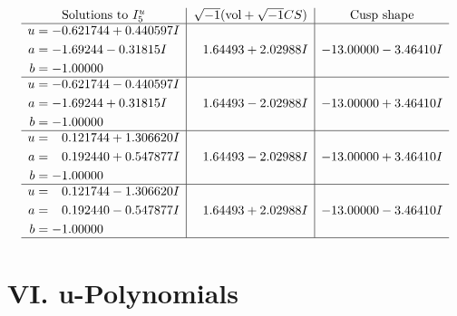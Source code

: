 \documentclass[1p]{elsarticle_modified}
\theoremstyle{definition}
\newcommand{\I}{\sqrt{-1}}
\begin{document}
$$\begin{array}{c|c|c}  
\text{Solutions to }I^u_{5}& \I (\text{vol} + \sqrt{-1}CS) & \text{Cusp shape}\\
 \hline 
\begin{aligned}
u &= -0.621744 + 0.440597 I \\
a &= -1.69244 - 0.31815 I \\
b &= -1.00000\phantom{ +0.000000I}\end{aligned}
 & \phantom{-}1.64493 + 2.02988 I & -13.00000 - 3.46410 I \\ \hline\begin{aligned}
u &= -0.621744 - 0.440597 I \\
a &= -1.69244 + 0.31815 I \\
b &= -1.00000\phantom{ +0.000000I}\end{aligned}
 & \phantom{-}1.64493 - 2.02988 I & -13.00000 + 3.46410 I \\ \hline\begin{aligned}
u &= \phantom{-}0.121744 + 1.306620 I \\
a &= \phantom{-}0.192440 + 0.547877 I \\
b &= -1.00000\phantom{ +0.000000I}\end{aligned}
 & \phantom{-}1.64493 - 2.02988 I & -13.00000 + 3.46410 I \\ \hline\begin{aligned}
u &= \phantom{-}0.121744 - 1.306620 I \\
a &= \phantom{-}0.192440 - 0.547877 I \\
b &= -1.00000\phantom{ +0.000000I}\end{aligned}
 & \phantom{-}1.64493 + 2.02988 I & -13.00000 - 3.46410 I\\
 \hline 
 \end{array}$$\newpage
\newpage\renewcommand{\arraystretch}{1}
\centering \section*{ VI. u-Polynomials}
\end{document}
